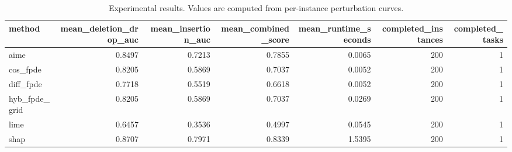 \begin{table}[t]
\caption{Experimental results. Values are computed from per-instance perturbation curves.}
\label{tab:main_results_computed}
\centering
\begin{tabular}{lrrrrrr}
\toprule
method & mean\_deletion\_drop\_auc & mean\_insertion\_auc & mean\_combined\_score & mean\_runtime\_seconds & completed\_instances & completed\_tasks \\
\midrule
aime & 0.8497 & 0.7213 & 0.7855 & 0.0065 & 200 & 1 \\
cos\_fpde & 0.8205 & 0.5869 & 0.7037 & 0.0052 & 200 & 1 \\
diff\_fpde & 0.7718 & 0.5519 & 0.6618 & 0.0052 & 200 & 1 \\
hyb\_fpde\_grid & 0.8205 & 0.5869 & 0.7037 & 0.0269 & 200 & 1 \\
lime & 0.6457 & 0.3536 & 0.4997 & 0.0545 & 200 & 1 \\
shap & 0.8707 & 0.7971 & 0.8339 & 1.5395 & 200 & 1 \\
\bottomrule
\end{tabular}

\end{table}
